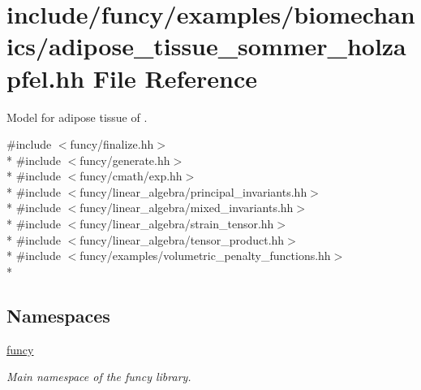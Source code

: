 \hypertarget{adipose__tissue__sommer__holzapfel_8hh}{\section{include/funcy/examples/biomechanics/adipose\-\_\-tissue\-\_\-sommer\-\_\-holzapfel.hh File Reference}
\label{adipose__tissue__sommer__holzapfel_8hh}
}


Model for adipose tissue of \cite{Sommer2013}.  


{\ttfamily \#include $<$funcy/finalize.\-hh$>$}\\*
{\ttfamily \#include $<$funcy/generate.\-hh$>$}\\*
{\ttfamily \#include $<$funcy/cmath/exp.\-hh$>$}\\*
{\ttfamily \#include $<$funcy/linear\-\_\-algebra/principal\-\_\-invariants.\-hh$>$}\\*
{\ttfamily \#include $<$funcy/linear\-\_\-algebra/mixed\-\_\-invariants.\-hh$>$}\\*
{\ttfamily \#include $<$funcy/linear\-\_\-algebra/strain\-\_\-tensor.\-hh$>$}\\*
{\ttfamily \#include $<$funcy/linear\-\_\-algebra/tensor\-\_\-product.\-hh$>$}\\*
{\ttfamily \#include $<$funcy/examples/volumetric\-\_\-penalty\-\_\-functions.\-hh$>$}\\*
\subsection*{Namespaces}
\begin{DoxyCompactItemize}
\item 
\hyperlink{namespacefuncy}{funcy}
\begin{DoxyCompactList}\small\item\em Main namespace of the funcy library. \end{DoxyCompactList}\end{DoxyCompactItemize}
